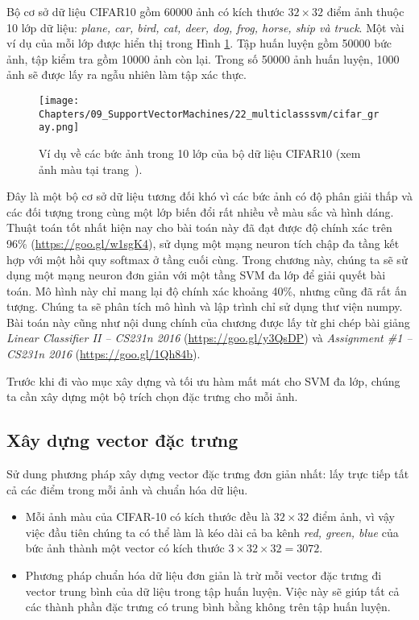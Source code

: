 Bộ cơ sở dữ liệu CIFAR10 gồm 60000 ảnh có kích thước $32 \times 32$ điểm ảnh
thuộc 10 lớp dữ liệu: \textit{plane, car, bird, cat, deer, dog, frog, horse,
ship và truck}. Một vài ví dụ của mỗi lớp được hiển thị trong Hình \ref{fig:22_2}.
Tập huấn luyện gồm 50000 bức ảnh, tập kiểm tra gồm 10000 ảnh còn lại.
Trong số 50000 ảnh huấn luyện, 1000 ảnh sẽ được lấy ra ngẫu nhiên làm tập xác
thực.
 \begin{figure}[t]
\centering
    \texttt{[image: Chapters/09\_SupportVectorMachines/22\_multiclasssvm/cifar\_gray.png]}
    \caption[]{Ví dụ về các bức ảnh trong 10 lớp của bộ dữ liệu CIFAR10 (xem ảnh màu tại trang~\pageref{fig:22_2_c}).}
    \label{fig:22_2}
\end{figure}
Đây là một bộ cơ sở dữ liệu tương đối khó vì các bức ảnh có độ phân giải thấp và
các đối tượng trong cùng một lớp biến đổi rất nhiều về màu sắc và hình dáng.
Thuật toán tốt nhất hiện nay cho bài toán này đã đạt được độ chính xác trên 96\%
(\url{https://goo.gl/w1sgK4}), sử dụng một mạng neuron tích chập đa tầng kết hợp
với một hồi quy softmax ở tầng cuối cùng. Trong chương này, chúng ta sẽ sử dụng
một mạng neuron đơn giản với một tầng SVM đa lớp để giải quyết bài toán. Mô hình
này chỉ mang lại độ chính xác khoảng 40\%, nhưng cũng đã rất ấn tượng. Chúng ta
sẽ phân tích mô hình và lập trình chỉ sử dụng thư viện numpy. Bài toán này cũng
như nội dung chính của chương được lấy từ ghi chép bài giảng \textit{Linear
Classifier II  --  CS231n 2016} (\url{https://goo.gl/y3QsDP}) và
\textit{Assignment \#1  --  CS231n 2016} (\url{https://goo.gl/1Qh84b}).
 
Trước khi đi vào mục xây dựng và tối ưu hàm mất mát cho SVM đa lớp, chúng ta cần xây dựng một bộ trích chọn đặc trưng cho mỗi ảnh. 
 
\subsection{Xây dựng vector đặc trưng}
Sử dung phương pháp xây dựng vector đặc trưng đơn giản nhất: lấy
trực tiếp tất cả các điểm trong mỗi ảnh và chuẩn hóa dữ liệu.
\begin{itemize}
    \item Mỗi ảnh {màu} của CIFAR-10 có kích thước đều là $32
    \times 32$ điểm ảnh, vì vậy việc đầu tiên chúng ta có thể làm là {kéo dài} cả ba kênh \textit{red, green, blue} của bức ảnh thành một vector có kích thước $3 \times 32 \times 32 = 3072$.
     
    \item Phương pháp chuẩn hóa dữ liệu đơn giản là trừ mỗi vector đặc trưng đi vector trung bình của dữ liệu trong tập huấn luyện. Việc này sẽ giúp tất cả các thành phần đặc trưng có trung bình bằng không trên tập huấn luyện. 
 
\end{itemize}
 

